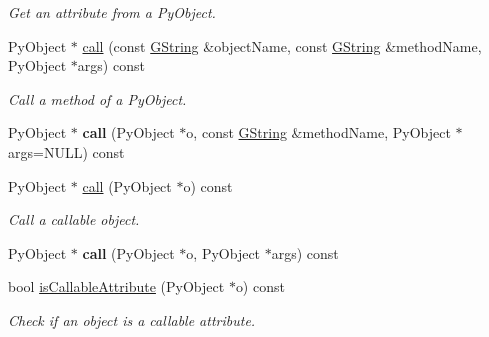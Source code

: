 \begin{Indent}
\begin{DoxyCompactItemize}
\begin{DoxyCompactList}\small\item\em Get an attribute from a Py\+Object. \end{DoxyCompactList}\item 
\mbox{\label{classrev_1_1_python_a_p_i_a957cd0e8a8486bb77b2d7b1f2e1fdeb8}} 
Py\+Object $\ast$ \mbox{\hyperlink{classrev_1_1_python_a_p_i_a957cd0e8a8486bb77b2d7b1f2e1fdeb8}{call}} (const \mbox{\hyperlink{classrev_1_1_g_string}{G\+String}} \&object\+Name, const \mbox{\hyperlink{classrev_1_1_g_string}{G\+String}} \&method\+Name, Py\+Object $\ast$args) const
\begin{DoxyCompactList}\small\item\em Call a method of a Py\+Object. \end{DoxyCompactList}\item 
\mbox{\label{classrev_1_1_python_a_p_i_a07a1d05621a2c9553126f1975f96c7f7}} 
Py\+Object $\ast$ {\bfseries call} (Py\+Object $\ast$o, const \mbox{\hyperlink{classrev_1_1_g_string}{G\+String}} \&method\+Name, Py\+Object $\ast$args=N\+U\+LL) const
\item 
\mbox{\label{classrev_1_1_python_a_p_i_abe9c910021bef8e881ff762fc52a1b91}} 
Py\+Object $\ast$ \mbox{\hyperlink{classrev_1_1_python_a_p_i_abe9c910021bef8e881ff762fc52a1b91}{call}} (Py\+Object $\ast$o) const
\begin{DoxyCompactList}\small\item\em Call a callable object. \end{DoxyCompactList}\item 
\mbox{\label{classrev_1_1_python_a_p_i_a817ba2778f45b379a374b4b6cf22f062}} 
Py\+Object $\ast$ {\bfseries call} (Py\+Object $\ast$o, Py\+Object $\ast$args) const
\item 
\mbox{\label{classrev_1_1_python_a_p_i_a7f98992ae4a9e03267eeed8feb3a7096}} 
bool \mbox{\hyperlink{classrev_1_1_python_a_p_i_a7f98992ae4a9e03267eeed8feb3a7096}{is\+Callable\+Attribute}} (Py\+Object $\ast$o) const
\begin{DoxyCompactList}\small\item\em Check if an object is a callable attribute. \end{DoxyCompactList}\item 

\end{DoxyCompactItemize}
\end{Indent}
